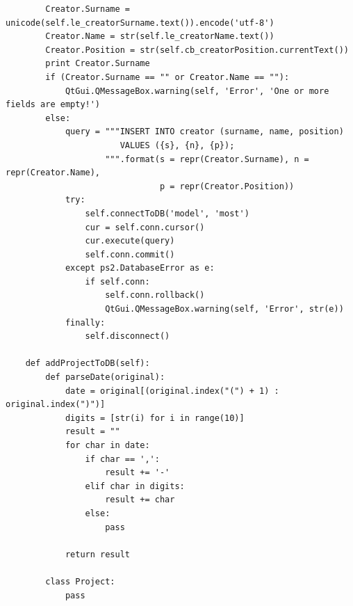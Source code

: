 \documentclass[a4paper, 12pt, titlepage]{article}
\begin{document}
\begin{otherlanguage}{russian}
\begin{lstlisting}
        Creator.Surname = unicode(self.le_creatorSurname.text()).encode('utf-8')
        Creator.Name = str(self.le_creatorName.text())
        Creator.Position = str(self.cb_creatorPosition.currentText())
        print Creator.Surname
        if (Creator.Surname == "" or Creator.Name == ""):
            QtGui.QMessageBox.warning(self, 'Error', 'One or more fields are empty!')
        else:
            query = """INSERT INTO creator (surname, name, position)
                       VALUES ({s}, {n}, {p});
                    """.format(s = repr(Creator.Surname), n = repr(Creator.Name), 
                               p = repr(Creator.Position))
            try:
                self.connectToDB('model', 'most')
                cur = self.conn.cursor()
                cur.execute(query)
                self.conn.commit()
            except ps2.DatabaseError as e:
                if self.conn:
                    self.conn.rollback()
                    QtGui.QMessageBox.warning(self, 'Error', str(e))
            finally:
                self.disconnect()

    def addProjectToDB(self):
        def parseDate(original):
            date = original[(original.index("(") + 1) : original.index(")")]
            digits = [str(i) for i in range(10)]
            result = ""
            for char in date:
                if char == ',':
                    result += '-'
                elif char in digits:
                    result += char
                else:
                    pass
                
            return result

        class Project:
            pass


\end{lstlisting}
\end{otherlanguage}
\end{document}
